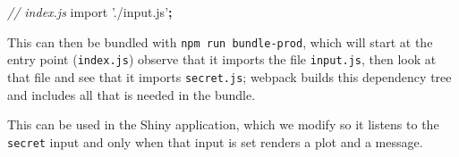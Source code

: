 \documentclass[10pt,]{krantz}
\makeatletter
\newenvironment{Shaded}{\begin{snugshade}}{\end{snugshade}}
\newcommand{\CommentTok}[1]{\textcolor[rgb]{0.37,0.37,0.37}{\textit{#1}}}
\newcommand{\ControlFlowTok}[1]{\textcolor[rgb]{0.27,0.27,0.27}{\textbf{#1}}}
\newcommand{\DataTypeTok}[1]{\textcolor[rgb]{0.27,0.27,0.27}{#1}}
\newcommand{\ImportTok}[1]{#1}
\newcommand{\KeywordTok}[1]{\textcolor[rgb]{0.27,0.27,0.27}{\textbf{#1}}}
\newcommand{\NormalTok}[1]{#1}
\newcommand{\OperatorTok}[1]{\textcolor[rgb]{0.43,0.43,0.43}{\textbf{#1}}}
\newcommand{\StringTok}[1]{\textcolor[rgb]{0.5,0.5,0.5}{#1}}
\newenvironment{kframe}{%
\medskip{}
\setlength{\fboxsep}{.8em}
 \def\at@end@of@kframe{}%
 \ifinner\ifhmode%
  \def\at@end@of@kframe{\end{minipage}}%
  \begin{minipage}{\columnwidth}%
 \fi\fi%
 \def\FrameCommand##1{\hskip\@totalleftmargin \hskip-\fboxsep
 \colorbox{shadecolor}{##1}\hskip-\fboxsep
     \hskip-\linewidth \hskip-\@totalleftmargin \hskip\columnwidth}%
 \MakeFramed {\advance\hsize-\width
   \@totalleftmargin\z@ \linewidth\hsize
   \@setminipage}}%
 {\par\unskip\endMakeFramed%
 \at@end@of@kframe}
\renewenvironment{Shaded}{\begin{kframe}}{\end{kframe}}
\makeatother
\begin{document}
\begin{Shaded}
\begin{Highlighting}[]
\CommentTok{// index.js}
\ImportTok{import} \StringTok{'./input.js'}\OperatorTok{;}
\end{Highlighting}
\end{Shaded}

This can then be bundled with \texttt{npm\ run\ bundle-prod}, which will start at the entry point (\texttt{index.js}) observe that it imports the file \texttt{input.js}, then look at that file and see that it imports \texttt{secret.js}; webpack builds this dependency tree and includes all that is needed in the bundle.

This can be used in the Shiny application, which we modify so it listens to the \texttt{secret} input and only when that input is set renders a plot and a message.

\begin{Shaded}
\end{Shaded}
\end{document}
